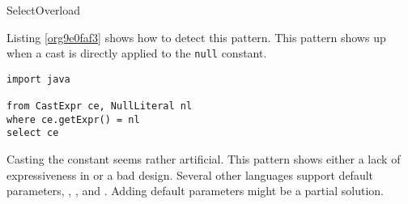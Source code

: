 \begin{pattern}{SelectOverload}
\detection

Listing \ref{org9e0faf3} shows how to detect this pattern.
This pattern shows up when a cast is directly applied to the \texttt{null} constant.

\begin{lstlisting}
import java

from CastExpr ce, NullLiteral nl
where ce.getExpr() = nl
select ce
\end{lstlisting}

\discussion

Casting the  constant seems rather artificial.
This pattern shows either a lack of expressiveness in \java{} or
a bad \api{} design.
Several other languages support default parameters, \eg{},
\scala{}, \cs{} and \cpp{}.
Adding default parameters might be a partial solution.

\end{pattern}
